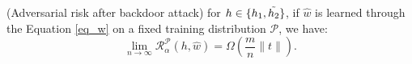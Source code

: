 {\begin{theorem}
\label{th_2}
(Adversarial risk after backdoor attack) for $h \in \{h_1, \Tilde{h_2}\}$, if $\hat{w}$ is learned through the Equation \ref{eq_w} on a fixed  training distribution $\mathcal{P}$, we have:
\[
\lim_{n\to\infty} \mathcal{R}^{\mathcal{P}}_{\alpha}(h,\hat{w}) = \Omega \left(\frac{m}{n} \| t \| \right).
\]
\end{theorem}
}









